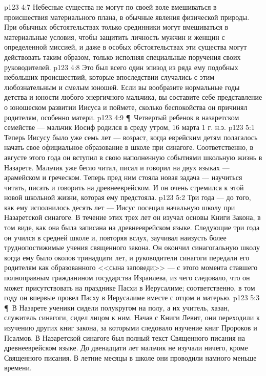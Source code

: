 \vs p123 4:7 Небесные существа не могут по своей воле вмешиваться в происшествия материального плана, в обычные явления физической природы. При обычных обстоятельствах только срединники могут вмешиваться в материальные условия, чтобы защитить личность мужчин и женщин с определенной миссией, и даже в особых обстоятельствах эти существа могут действовать таким образом, только исполняя специальные поручения своих руководителей.
\vs p123 4:8 Это был всего один эпизод из ряда ему подобных небольших происшествий, которые впоследствии случались с этим любознательным и смелым юношей. Если вы вообразите нормальные годы детства и юности любого энергичного мальчика, вы составите себе представление о юношеском развитии Иисуса и поймете, сколько беспокойства он причинял родителям, особенно матери.
\vs p123 4:9 \P\ Четвертый ребенок в назаретском семействе --- мальчик Иосиф родился в среду утром, 16 марта 1 г. н.э.
\vs p123 5:1 Теперь Иисусу было уже семь лет --- возраст, когда еврейским детям полагалось начать свое официальное образование в школе при синагоге. Соответственно, в августе этого года он вступил в свою наполненную событиями школьную жизнь в Назарете. Мальчик уже бегло читал, писал и говорил на двух языках --- арамейском и греческом. Теперь пред ним стояла новая задача --- научиться читать, писать и говорить на древнееврейском. И он очень стремился к этой новой школьной жизни, которая ему предстояла.
\vs p123 5:2 Три года --- до того, как ему исполнилось десять лет --- Иисус посещал начальную школу при Назаретской синагоге. В течение этих трех лет он изучал основы Книги Закона, в том виде, как она была записана на древнееврейском языке. Следующие три года он учился в средней школе и, повторяя вслух, заучивал наизусть более труднопостижимые учения священного закона. Он окончил синагогальную школу когда ему было околов тринадцати лет, и руководители синагоги передали его родителям как образованного <<сына заповеди>> --- с этого момента ставшего полноправным гражданином государства Израилева, из чего следовало, что он может присутствовать на празднике Пасхи в Иерусалиме; соответственно, в том году он впервые провел Пасху в Иерусалиме вместе с отцом и матерью.
\vs p123 5:3 \P\ В Назарете ученики сидели полукругом на полу, а их учитель, хазан, служитель синагоги, сидел лицом к ним. Начав с Книги Левит, они переходили к изучению других книг закона, за которыми следовало изучение книг Пророков и Псалмов. В Назаретской синагоге был полный текст Священного писания на древнееврейском языке. До двенадцати лет мальчик не изучали ничего, кроме Священного писания. В летние месяцы в школе они проводили намного меньше времени.
